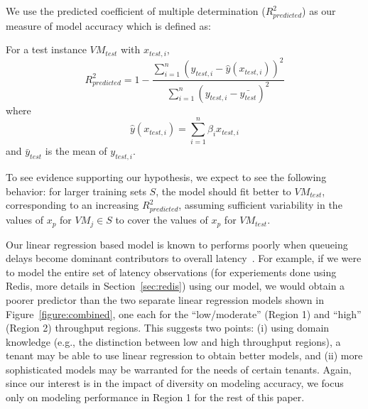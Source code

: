  We use the predicted coefficient of multiple determination ($R^2_{predicted}$) as our measure of model accuracy which is defined as: 
\begin{definition}
For a test instance $VM_{test}$ with $x_{test,i}$,
\begin{displaymath}
R_{predicted}^2=1-\frac{\sum_{i=1}^{n} (y_{test,i} - \hat{y}(x_{test,i}))^{2}}{\sum_{i=1}^{n} (y_{test,i} - \bar{y_{test}})^{2}}
\end{displaymath}
where
\begin{displaymath}
\hat{y}(x_{test,i})=\sum_{i=1}^{n} \beta_i x_{test,i}
\end{displaymath}
and $\bar{y}_{test}$ is the mean of $y_{test,i}$.
\end{definition}


To see evidence supporting our hypothesis, we expect to see the following behavior: for larger training sets $S$, the model should fit better to $VM_{test}$, corresponding to an increasing $R^2_{predicted}$, assuming sufficient variability in the values of $x_p$ for $VM_j\in S$ to cover the values of $x_p$ for $VM_{test}$.  

 Our linear regression based model is known to performs poorly when queueing delays become dominant contributors to overall latency~\cite{Stewart07}. 
For example, if we were to model the entire set of latency observations (for experiements done using Redis, more details
in Section~\ref{sec:redis}) using our model, we would obtain a poorer predictor than the two separate linear regression
models shown in Figure~\ref{figure:combined}, one each for the ``low/moderate'' (Region 1) and ``high'' (Region 2) throughput regions. This suggests two points: (i) using domain knowledge (e.g., the distinction between low and high throughput regions), a 
tenant may be able to use linear regression to obtain better models, and (ii) more sophisticated models may be 
warranted for the needs of certain tenants. Again, since our interest is in the impact of diversity on modeling accuracy,
we focus only on modeling performance in Region 1 for the rest of this paper. 

